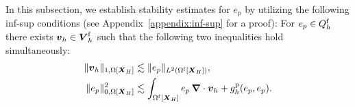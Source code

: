 \documentclass[11pt,reqno]{amsart}
\theoremstyle{definition}
\theoremstyle{plain}
\numberwithin{theorem}{section}
\numberwithin{proposition}{section}
\numberwithin{lemma}{section}
\numberwithin{equation}{section}
\newcommand{\bs}[1]{\boldsymbol{#1}}
\newcommand{\uu}[1]  {{\bs{#1}} }
\newcommand{\grad}   { \uu{\nabla}    }
\def\b{\color{blue}}
\renewcommand{\(}{\bigl(}
\renewcommand{\)}{\bigr)}
\begin{document}
In this subsection, we establish stability estimates for $e_{p}$ by utilizing the following inf-sup conditions (see Appendix~\ref{appendix:inf-sup} for a proof): For  $e_p\in Q_h^{\rm f}$ there exists ${\bs v}_h\in  {\bs V}_h^{\rm f}$
such that the following two inequalities hold simultaneously: 
\begin{subequations}\label{inf-sup-ep-L2}
\begin{align}
\|{\bs v}_h\|_{1,\Omega[{\bs X}_H]} 
&\lesssim \| e_p\|_{L^2(\Omega^{\rm f}[{\bs X}_H])},\\
%
\| e_p\|_{0,\Omega[{\bs X}_H]}^2 
&\lesssim 
\int_{\Omega^{\rm f}[{\bs X}_H]} e_p \,\grad\cdot {\bs v}_h + g^{\rm p}_h(e_p,e_p) .
\end{align}
\end{subequations}
%
\end{document}
